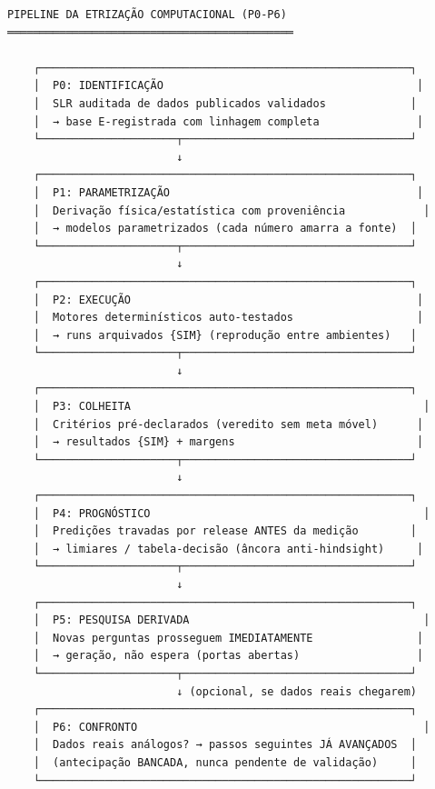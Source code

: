 \documentclass[
  10pt,
]{article}
\begin{document}
\begin{verbatim}
PIPELINE DA ETRIZAÇÃO COMPUTACIONAL (P0-P6)
════════════════════════════════════════════

    ┌─────────────────────────────────────────────────────────┐
    │  P0: IDENTIFICAÇÃO                                       │
    │  SLR auditada de dados publicados validados             │
    │  → base E-registrada com linhagem completa               │
    └─────────────────────┬───────────────────────────────────┘
                          ↓
    ┌─────────────────────────────────────────────────────────┐
    │  P1: PARAMETRIZAÇÃO                                      │
    │  Derivação física/estatística com proveniência            │
    │  → modelos parametrizados (cada número amarra a fonte)  │
    └─────────────────────┬───────────────────────────────────┘
                          ↓
    ┌─────────────────────────────────────────────────────────┐
    │  P2: EXECUÇÃO                                            │
    │  Motores determinísticos auto-testados                   │
    │  → runs arquivados {SIM} (reprodução entre ambientes)   │
    └─────────────────────┬───────────────────────────────────┘
                          ↓
    ┌─────────────────────────────────────────────────────────┐
    │  P3: COLHEITA                                             │
    │  Critérios pré-declarados (veredito sem meta móvel)      │
    │  → resultados {SIM} + margens                            │
    └─────────────────────┬───────────────────────────────────┘
                          ↓
    ┌─────────────────────────────────────────────────────────┐
    │  P4: PROGNÓSTICO                                          │
    │  Predições travadas por release ANTES da medição        │
    │  → limiares / tabela-decisão (âncora anti-hindsight)     │
    └─────────────────────┬───────────────────────────────────┘
                          ↓
    ┌─────────────────────────────────────────────────────────┐
    │  P5: PESQUISA DERIVADA                                    │
    │  Novas perguntas prosseguem IMEDIATAMENTE                │
    │  → geração, não espera (portas abertas)                  │
    └─────────────────────┬───────────────────────────────────┘
                          ↓ (opcional, se dados reais chegarem)
    ┌─────────────────────────────────────────────────────────┐
    │  P6: CONFRONTO                                            │
    │  Dados reais análogos? → passos seguintes JÁ AVANÇADOS  │
    │  (antecipação BANCADA, nunca pendente de validação)     │
    └─────────────────────────────────────────────────────────┘
\end{verbatim}
\end{document}
